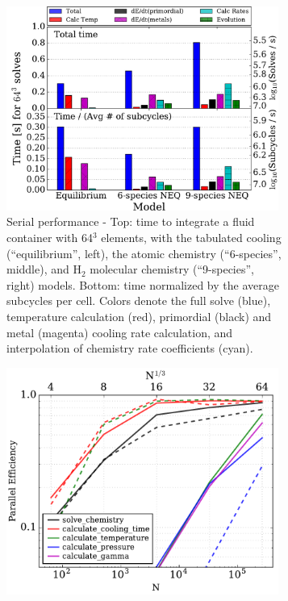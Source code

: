 \begin{figure}[h]
\centering
\begin{subfigure}{.54\textwidth}
  \centering
  \includegraphics[width=0.98\textwidth]{figures/performance.pdf}
  \caption{Serial performance - Top: time
    to integrate a fluid container with 64$^{3}$ elements, with the
    tabulated cooling (``equilibrium'', left), the atomic chemistry
    (``6-species'', middle), and H$_{2}$ molecular chemistry
    (``9-species'', right) models.  Bottom: time normalized by the
    average subcycles per cell.  Colors denote the full solve
    (blue), temperature calculation (red), primordial (black) and metal
    (magenta) cooling rate calculation, and interpolation of chemistry
    rate coefficients (cyan).}
  \label{fig:single-proc}
\end{subfigure}%
\hspace{0.02\textwidth}
\begin{subfigure}{.42\textwidth}
  \centering
  \includegraphics[width=0.98\textwidth]{figures/openmp.pdf}

\end{subfigure}
\end{figure}
